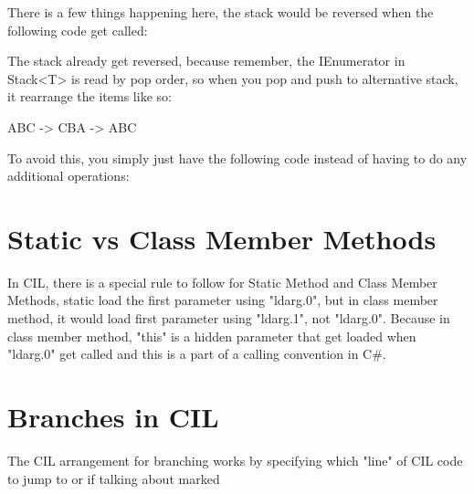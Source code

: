 

There is a few things happening here, the stack would be reversed when the following code get called:



The stack already get reversed, because remember, the IEnumerator in Stack<T> is read by pop order, so when you pop and push to alternative stack, it rearrange the items like so:

ABC -> CBA -> ABC

To avoid this, you simply just have the following code instead of having to do any additional operations:



\newpage
\section{Static vs Class Member Methods}
In CIL, there is a special rule to follow for Static Method and Class Member Methods, static load the first parameter using "ldarg.0", but in class member method, it would load first parameter using "ldarg.1", not "ldarg.0". Because in class member method, "this" is a hidden parameter that get loaded when "ldarg.0" get called and this is a part of a calling convention in C\#.



\section{Branches in CIL}

The CIL arrangement for branching works by specifying which "line" of CIL code to jump to or if talking about marked